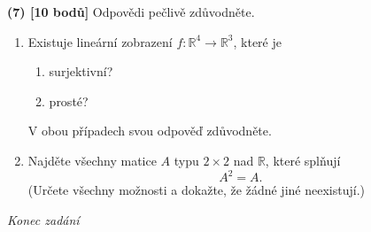 \documentclass[12pt,a4paper]{article}
\begin{document}
\newpage

\textbf{(7) [10 bodů]} Odpovědi pečlivě zdůvodněte.

\begin{enumerate}
\item Existuje lineární zobrazení $f\colon \mathbb{R}^4\to\mathbb{R}^3$, které je
\begin{enumerate}
  \item surjektivní?
  \item prosté?
\end{enumerate}
V obou případech svou odpověď zdůvodněte.

\item Najděte všechny matice $A$ typu $2\times 2$ nad $\mathbb{R}$, které splňují
\[
A^2 = A.
\]
(Určete všechny možnosti a dokažte, že žádné jiné neexistují.)
\end{enumerate}

\vfill
\begin{center}
\textit{Konec zadání}
\end{center}
\end{document}

